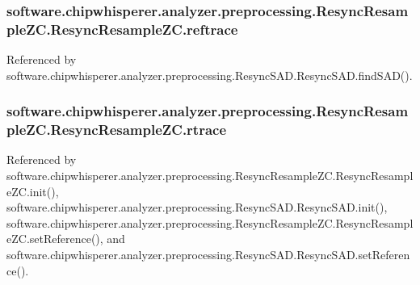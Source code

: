 \subsubsection[{reftrace}]{\setlength{\rightskip}{0pt plus 5cm}software.\+chipwhisperer.\+analyzer.\+preprocessing.\+Resync\+Resample\+Z\+C.\+Resync\+Resample\+Z\+C.\+reftrace}\label{classsoftware_1_1chipwhisperer_1_1analyzer_1_1preprocessing_1_1ResyncResampleZC_1_1ResyncResampleZC_a8f5b6a1f4802e6dc958b29426d5addf9}


Referenced by software.\+chipwhisperer.\+analyzer.\+preprocessing.\+Resync\+S\+A\+D.\+Resync\+S\+A\+D.\+find\+S\+A\+D().

\hypertarget{classsoftware_1_1chipwhisperer_1_1analyzer_1_1preprocessing_1_1ResyncResampleZC_1_1ResyncResampleZC_aff2f7326db7dd0e654700cbcb8b9e754}{}
\subsubsection[{rtrace}]{\setlength{\rightskip}{0pt plus 5cm}software.\+chipwhisperer.\+analyzer.\+preprocessing.\+Resync\+Resample\+Z\+C.\+Resync\+Resample\+Z\+C.\+rtrace}\label{classsoftware_1_1chipwhisperer_1_1analyzer_1_1preprocessing_1_1ResyncResampleZC_1_1ResyncResampleZC_aff2f7326db7dd0e654700cbcb8b9e754}


Referenced by software.\+chipwhisperer.\+analyzer.\+preprocessing.\+Resync\+Resample\+Z\+C.\+Resync\+Resample\+Z\+C.\+init(), software.\+chipwhisperer.\+analyzer.\+preprocessing.\+Resync\+S\+A\+D.\+Resync\+S\+A\+D.\+init(), software.\+chipwhisperer.\+analyzer.\+preprocessing.\+Resync\+Resample\+Z\+C.\+Resync\+Resample\+Z\+C.\+set\+Reference(), and software.\+chipwhisperer.\+analyzer.\+preprocessing.\+Resync\+S\+A\+D.\+Resync\+S\+A\+D.\+set\+Reference().

\hypertarget{classsoftware_1_1chipwhisperer_1_1analyzer_1_1preprocessing_1_1ResyncResampleZC_1_1ResyncResampleZC_aafac1084581095b34dfb9b7ac44be9e7}{}
